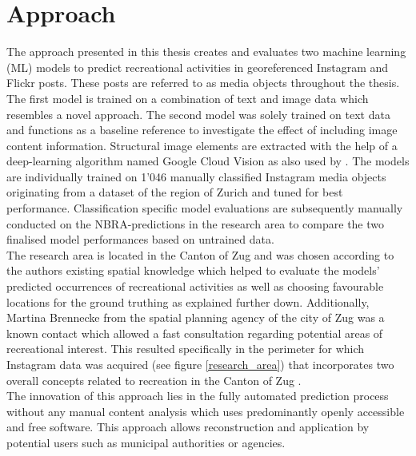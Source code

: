 \section{Approach}
The approach presented in this thesis creates and evaluates two machine learning (ML) models to predict recreational activities in georeferenced Instagram and Flickr posts. These posts are referred to as media objects throughout the thesis. The first model is trained on a combination of text and image data which resembles a novel approach. The second model was solely trained on text data and functions as a baseline reference to investigate the effect of including image content information. Structural image elements are extracted with the help of a deep-learning algorithm named Google Cloud Vision as also used by \textcite{Richards2018}. The models are individually trained on 1'046 manually classified Instagram media objects originating from a dataset of the region of Zurich \parencite{Gruzd2016} and tuned for best performance. Classification specific model evaluations are subsequently manually conducted on the NBRA-predictions in the research area to compare the two finalised model performances based on untrained data.\\
The research area is located in the Canton of Zug and was chosen according to the authors existing spatial knowledge which helped to evaluate the models' predicted occurrences of recreational activities as well as choosing favourable locations for the ground truthing as explained further down. Additionally, Martina Brennecke from the spatial planning agency of the city of Zug was a known contact which allowed a fast consultation regarding potential areas of recreational interest. This resulted specifically in the perimeter for which Instagram data was acquired (see figure \ref{research_area}) that incorporates two overall concepts related to recreation in the Canton of Zug \parencite{BaudirektiondesKantonsZug2012, Berchtold2011}.\\
\newline
The innovation of this approach lies in the fully automated prediction process without any manual content analysis which uses predominantly openly accessible and free software. This approach allows reconstruction and application by potential users such as municipal authorities or agencies. \\
\newline

